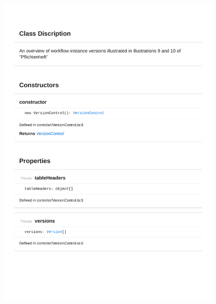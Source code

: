 \begin{figure}[H]
\centerline{\includegraphics[width=\textwidth]{FrontendDocsAsPDF/Model/VersionControl.pdf}}
\end{figure}


